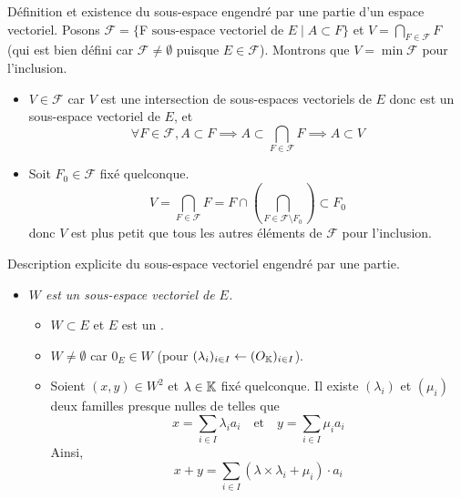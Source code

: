\documentclass{article}
\begin{document}
\begin{question_kholle}{Définition et existence du sous-espace engendré par une partie d’un espace vectoriel.}
	Posons $\mathcal{F}=\{$F$ \text{ sous-espace vectoriel de } E \mid A\subset F\}$ et $\displaystyle V=\bigcap_{F\in \mathcal{F}}F$ (qui est bien défini car $\mathcal{F}\neq \emptyset$ puisque $E\in\mathcal F$). Montrons que $V=\min \mathcal{F}$ pour l’inclusion.
	\begin{itemize}
		\item $V\in \mathcal{F}$ car $V$ est une intersection de sous-espaces vectoriels de $E$ donc est un sous-espace vectoriel de $E$, et
		      \[
			      \forall F\in \mathcal{F}, A\subset F \implies  A\subset \bigcap_{F\in \mathcal{F}}F \implies A\subset V
		      \]
		\item Soit $F_{0}\in \mathcal{F}$ fixé quelconque.
		      \[
			      V=\bigcap_{F\in \mathcal{F}} F = F \cap \left(\bigcap_{F\in \mathcal{F}\setminus F_{0}}\right)\subset F_{0}
		      \]
		      donc $V$ est plus petit que tous les autres éléments de $\mathcal{F}$ pour l’inclusion.
	\end{itemize}
\end{question_kholle}

\begin{question_kholle}{Description explicite du sous-espace vectoriel engendré par une partie.}
	\hfill\\
	\begin{itemize}[label=$\vartriangleright$]
		\item \textit{$W$ est un sous-espace vectoriel de $E$.}
		      \begin{itemize}[label=$\star$]
			      \item $W\subset E$ et $E$ est un \ev.
			      \item $W\neq \emptyset$ car $0_{E}\in W$ (pour $(\lambda_{i})_{i\in I}\leftarrow (O_{\mathbb K})_{i\in I}$).
			      \item Soient $(x,y)\in W^{2}$ et $\lambda\in\mathbb K$ fixé quelconque. Il existe $(\lambda_{i})$ et $(\mu_{i})$ deux familles presque nulles de \K telles que
			            \[
				            x= \sum_{i\in I}\lambda_{i} a_{i} \quad\text{et}\quad y=\sum_{i\in I}\mu_{i} a_{i}
			            \]
			            Ainsi,
			            \[
				            x+y = \sum_{i\in I}(\lambda \times \lambda_{i} + \mu_{i})\cdot a_{i}
			            \]

		      \end{itemize}
	\end{itemize}
\end{question_kholle}
\end{document}
